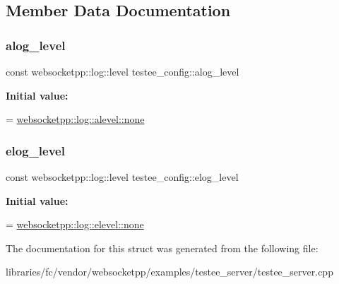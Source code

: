 \subsection{Member Data Documentation}
\mbox{\label{structtestee__config_af49d8b77cff03f1f66ff84d4d293c313}} 
\subsubsection{\texorpdfstring{alog\+\_\+level}{alog\_level}}
{\footnotesize\ttfamily const websocketpp\+::log\+::level testee\+\_\+config\+::alog\+\_\+level\hspace{0.3cm}{\ttfamily [static]}}

{\bfseries Initial value\+:}
\begin{DoxyCode}
=
        \mbox{\hyperlink{structwebsocketpp_1_1log_1_1alevel_a4cf0520816094999975fe73081cf30f2}{websocketpp::log::alevel::none}}
\end{DoxyCode}
\mbox{\label{structtestee__config_ae934c27283c78b7e51499e723436265c}} 
\subsubsection{\texorpdfstring{elog\+\_\+level}{elog\_level}}
{\footnotesize\ttfamily const websocketpp\+::log\+::level testee\+\_\+config\+::elog\+\_\+level\hspace{0.3cm}{\ttfamily [static]}}

{\bfseries Initial value\+:}
\begin{DoxyCode}
=
        \mbox{\hyperlink{structwebsocketpp_1_1log_1_1elevel_ae86395aa26ec2089e07fd63b62a549fa}{websocketpp::log::elevel::none}}
\end{DoxyCode}


The documentation for this struct was generated from the following file\+:\begin{DoxyCompactItemize}
\item 
libraries/fc/vendor/websocketpp/examples/testee\+\_\+server/testee\+\_\+server.\+cpp\end{DoxyCompactItemize}
